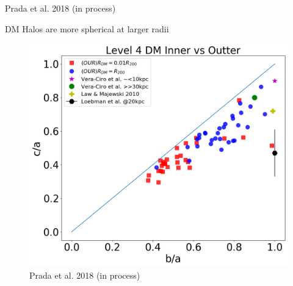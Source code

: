 \documentclass[xcolor=dvipsnames]{beamer}
\begin{document}
\begin{frame}[plain]
\begin{figure}[!ht]
  \hfill %
\normalsize
  \label{fig:slices}
\end{figure}
\centering
\tiny Prada et al. 2018 (in process)


\end{frame}


\begin{frame}

\centering
DM Halos are more spherical at larger radii
\begin{figure}[!ht]
  \centering
  \includegraphics[width=0.6\columnwidth]{./pics/Triaxiality_DM_lvl4.png}
  \hfill
  \caption{\tiny Prada et al. 2018 (in process)}
\end{figure}
\normalsize

\end{frame}
\end{document}
